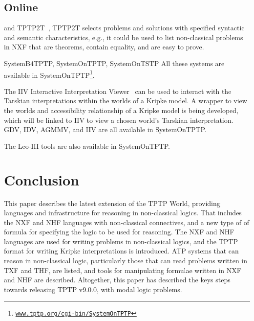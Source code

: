 \documentclass{ceurart}
\begin{document}
\subsection{Online}
\label{Online}

and TPTP2T~\cite{Sut10}, 
TPTP2T selects problems and solutions with specified syntactic and semantic characteristics,
e.g., it could be used to list non-classical problems in NXF that are theorems, contain equality,
and are easy to prove.

SystemB4TPTP, SystemOnTPTP, SystemOnTSTP
All these systems are available in SystemOnTPTP\footnote{%
\href{https://www.tptp.org/cgi-bin/SystemOnTPTP}{\tt www.tptp.org/cgi-bin/SystemOnTPTP}}.

The IIV Interactive Interpretation Viewer~\cite{MS23-Poster} can be used to interact with the
Tarskian interpretations within the worlds of a Kripke model. 
A wrapper to view the worlds and accessibility relationship of a Kripke model is being developed,
which will be linked to IIV to view a chosen world's Tarskian interpretation.
GDV, IDV, AGMMV, and IIV are all available in SystemOnTPTP.

The Leo-III tools are also available in SystemOnTPTP.

\section{Conclusion}
\label{Conclusion}

This paper describes the latest extension of the TPTP World, providing languages and
infrastructure for reasoning in non-classical logics.
That includes the NXF and NHF languages with non-classical connectives, and a new type of
of formula for specifying the logic to be used for reasoning.
The NXF and NHF languages are used for writing problems in non-classical logics, and the
TPTP format for writing Kripke interpretations is introduced.
ATP systems that can reason in non-classical logic, particularly those that can read 
problems written in TXF and THF, are listed, and tools for manipulating formulae written in 
NXF and NHF are described.
Altogether, this paper has described the keys steps towards releasing TPTP v9.0.0,
with modal logic problems.
\end{document}
